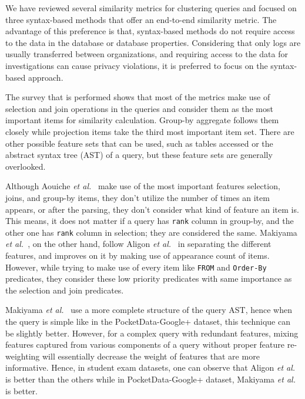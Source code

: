 We have reviewed several similarity metrics for clustering queries and focused on three syntax-based methods that offer an end-to-end similarity metric. 
The advantage of this preference is that, syntax-based methods do not require access to the data in the database or database properties. Considering that only logs are usually transferred between organizations, and requiring access to the data for investigations can cause privacy violations, it is preferred to focus on the syntax-based approach.

The survey that is performed shows that most of the metrics make use of selection and join operations in the queries and consider them as the most important items for similarity calculation. Group-by aggregate follows them closely while projection items take the third most important item set. There are other possible feature sets that can be used, such as tables accessed or the abstract syntax tree (AST) of a query, but these feature sets are generally overlooked.

Although Aouiche \textit{et al.}~\cite{aouiche2006} make use of the most important features selection, joins, and group-by items, they don't utilize the number of times an item appears, or after the parsing, they don't consider what kind of feature an item is. This means, it does not matter if a query has \texttt{rank} column in group-by, and the other one has \texttt{rank} column in selection; they are considered the same. Makiyama \textit{et al.}~\cite{makiyama2015text}, on the other hand, follow Aligon \textit{et al.}~\cite{aligon2014similarity} in separating the different features, and improves on it by making use of appearance count of items. However, while trying to make use of every item like \texttt{FROM} and \texttt{Order-By} predicates, they consider these low priority predicates with same importance as the selection and join predicates.

Makiyama \textit{et al.}~\cite{makiyama2015text} use a more complete structure of the query AST, hence when the query is simple like in the PocketData-Google+ dataset, this technique can be slightly better.
However, for a complex query with redundant features, mixing features captured from various components of a query without proper feature re-weighting will essentially decrease the weight of features that are more informative.
Hence, in student exam datasets, one can observe that Aligon \textit{et al.}~\cite{aligon2014similarity} is better than the others while in PocketData-Google+ dataset, Makiyama \textit{et al.}~\cite{makiyama2015text} is better.

